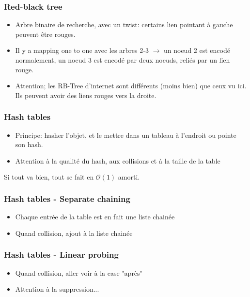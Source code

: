 \documentclass[8pt,aspectratio=169]{beamer}
\begin{document}
\begin{frame}
\frametitle{Red-black tree}
\begin{itemize}
	\item Arbre binaire de recherche, avec un twist: certains lien pointant à gauche peuvent être rouges.
	\item Il y a mapping one to one avec les arbres 2-3 $\rightarrow$ un noeud 2 est encodé normalement, un noeud 3 est encodé par deux noeuds, reliés par un lien rouge.
	\item Attention; les RB-Tree d'internet sont différents (moins bien) que ceux vu ici. Ils peuvent avoir des liens rouges vers la droite.
\end{itemize}
\end{frame}

\begin{frame}
\frametitle{Hash tables}
\begin{itemize}
	\item Principe: hasher l'objet, et le mettre dans un tableau à l'endroit ou pointe son hash.
	\item Attention à la qualité du hash, aux collisions et à la taille de la table
\end{itemize}
Si tout va bien, tout se fait en $\mathcal{O}(1)$ amorti.
\end{frame}

\begin{frame}
\frametitle{Hash tables - Separate chaining}
\begin{itemize}
	\item Chaque entrée de la table est en fait une liste chainée
	\item Quand collision, ajout à la liste chainée
\end{itemize}
\end{frame}

\begin{frame}
\frametitle{Hash tables - Linear probing}
\begin{itemize}
	\item Quand collision, aller voir à la case "après"
	\item Attention à la suppression...
\end{itemize}
\end{frame}
\end{document}
